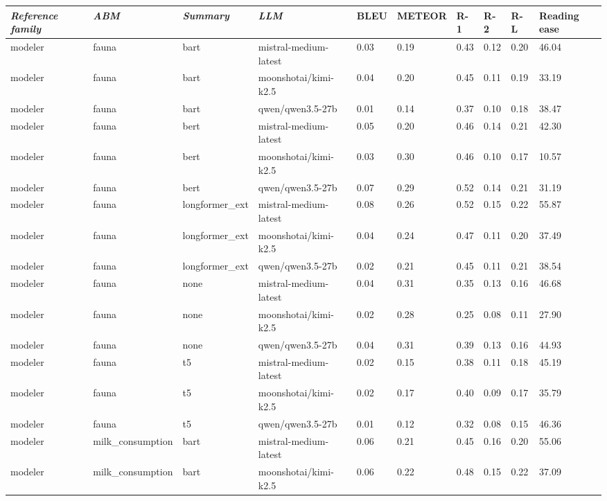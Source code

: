 \begin{tabular}{|l|l|l|l|l|l|l|l|l|l|}
\hline
\textit{\textbf{Reference family}} & \textit{\textbf{ABM}} & \textit{\textbf{Summary}} & \textit{\textbf{LLM}} & BLEU & METEOR & R-1 & R-2 & R-L & Reading ease \\
 \hline
 modeler & fauna & bart & mistral-medium-latest & 0.03 & 0.19 & 0.43 & 0.12 & 0.20 & 46.04 \\
 \hline
 modeler & fauna & bart & moonshotai/kimi-k2.5 & 0.04 & 0.20 & 0.45 & 0.11 & 0.19 & 33.19 \\
 \hline
 modeler & fauna & bart & qwen/qwen3.5-27b & 0.01 & 0.14 & 0.37 & 0.10 & 0.18 & 38.47 \\
 \hline
 modeler & fauna & bert & mistral-medium-latest & 0.05 & 0.20 & 0.46 & 0.14 & 0.21 & 42.30 \\
 \hline
 modeler & fauna & bert & moonshotai/kimi-k2.5 & 0.03 & 0.30 & 0.46 & 0.10 & 0.17 & 10.57 \\
 \hline
 modeler & fauna & bert & qwen/qwen3.5-27b & 0.07 & 0.29 & 0.52 & 0.14 & 0.21 & 31.19 \\
 \hline
 modeler & fauna & longformer\_ext & mistral-medium-latest & 0.08 & 0.26 & 0.52 & 0.15 & 0.22 & 55.87 \\
 \hline
 modeler & fauna & longformer\_ext & moonshotai/kimi-k2.5 & 0.04 & 0.24 & 0.47 & 0.11 & 0.20 & 37.49 \\
 \hline
 modeler & fauna & longformer\_ext & qwen/qwen3.5-27b & 0.02 & 0.21 & 0.45 & 0.11 & 0.21 & 38.54 \\
 \hline
 modeler & fauna & none & mistral-medium-latest & 0.04 & 0.31 & 0.35 & 0.13 & 0.16 & 46.68 \\
 \hline
 modeler & fauna & none & moonshotai/kimi-k2.5 & 0.02 & 0.28 & 0.25 & 0.08 & 0.11 & 27.90 \\
 \hline
 modeler & fauna & none & qwen/qwen3.5-27b & 0.04 & 0.31 & 0.39 & 0.13 & 0.16 & 44.93 \\
 \hline
 modeler & fauna & t5 & mistral-medium-latest & 0.02 & 0.15 & 0.38 & 0.11 & 0.18 & 45.19 \\
 \hline
 modeler & fauna & t5 & moonshotai/kimi-k2.5 & 0.02 & 0.17 & 0.40 & 0.09 & 0.17 & 35.79 \\
 \hline
 modeler & fauna & t5 & qwen/qwen3.5-27b & 0.01 & 0.12 & 0.32 & 0.08 & 0.15 & 46.36 \\
 \hline
 modeler & milk\_consumption & bart & mistral-medium-latest & 0.06 & 0.21 & 0.45 & 0.16 & 0.20 & 55.06 \\
 \hline
 modeler & milk\_consumption & bart & moonshotai/kimi-k2.5 & 0.06 & 0.22 & 0.48 & 0.15 & 0.22 & 37.09 \\

\end{tabular}
